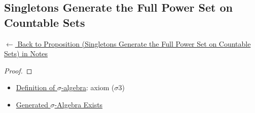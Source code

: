 
\subsection*{Singletons Generate the Full Power Set on Countable Sets}
\label{prf:sigma-from-singletons}

\begin{remark*}[Return]
\hyperref[prop:sigma-from-singletons]{$\leftarrow$ Back to Proposition (Singletons Generate the Full Power Set on Countable Sets) in Notes}
\end{remark*}

\begin{proof}
\end{proof}

\begin{remark*}

\end{remark*}

\begin{remark*}[Dependencies]
\begin{itemize}
  \item \hyperref[def:sigma-algebra]{Definition of $\sigma$-algebra}: axiom ($\sigma$3)
  \item \hyperref[prop:generated-sigma-exists]{Generated $\sigma$-Algebra Exists}
\end{itemize}

\end{remark*}
